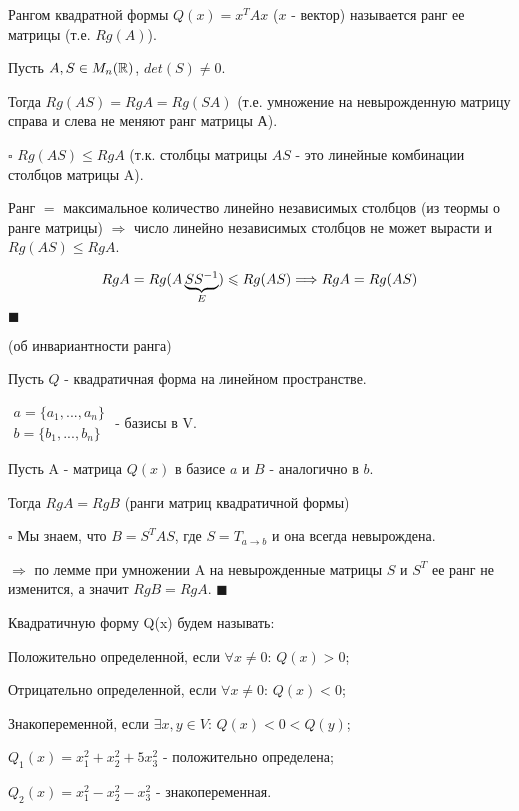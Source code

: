 \documentclass[../main.tex]{subfiles}
\begin{document}
\void{} Рангом квадратной формы $Q(x) = x^T A x$ ($x$ - вектор)
называется ранг ее матрицы (т.е. $Rg(A)$).

\void{} Пусть $A, S\in M_n(\mathbb{R})$, $det(S)\neq 0$.

Тогда $Rg(AS) = RgA = Rg(SA)$ (т.е. умножение на невырожденную матрицу справа и слева не меняют
ранг матрицы А).

\void $\square$ $Rg(AS)\leqslant RgA$ (т.к. столбцы матрицы $AS$ - это линейные комбинации столбцов матрицы A).

Ранг $=$ максимальное количество линейно независимых столбцов (из теормы о ранге матрицы) $\Longrightarrow$
число линейно независимых столбцов не может вырасти и $Rg(AS)\leqslant RgA$.

$$ RgA = Rg(A\underbrace{SS^{-1}}_{E})\leqslant Rg(AS) \Longrightarrow RgA = Rg(AS)$$
$\blacksquare$

\void{} (об инвариантности ранга)

Пусть $Q$ - квадратичная форма на линейном пространстве.

$\begin{matrix} a = \{a_1,...,a_n\}\\ b=\{b_1,...,b_n\} \end{matrix}$ - базисы в V.

Пусть A - матрица $Q(x)$ в базисе $a$ и $B$ - аналогично в $b$.

Тогда $RgA = RgB$ (ранги матриц квадратичной формы)

\void $\square$ Мы знаем, что $B = S^TAS$, где $S = T_{a\rightarrow b}$ и она всегда невырождена.

$\Longrightarrow$ по лемме при умножении A на невырожденные матрицы $S$ и $S^T$ ее ранг не изменится, а
значит $RgB = RgA$. $\blacksquare$

\void{} Квадратичную форму Q(x) будем называть:

\void{} Положительно определенной, если $\forall x\neq 0$: $Q(x) > 0$;

\void{} Отрицательно определенной, если $\forall x\neq 0$: $Q(x) < 0$;

\void{} Знакопеременной, если $\exists x,y\in V$: $Q(x) < 0 < Q(y)$;

\void{}

\void{} $Q_1(x) = x^2_1 + x^2_2 + 5x^2_3$ - положительно определена;

\void{} $Q_2(x) = x^2_1 - x^2_2 - x^2_3$ - знакопеременная.
\end{document}
